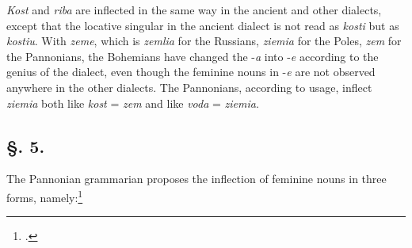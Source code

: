 \textit{Kost} and \textit{riba} are inflected in the same way in the ancient and other dialects, except that the locative singular in the ancient dialect is not read as \textit{kosti} but as \textit{kostiu}. With \textit{zeme}, which is \textit{zemlia} for the Russians, \textit{ziemia} for the Poles, \textit{zem} for the Pannonians, the Bohemians have changed the -\textit{a} into -\textit{e} according to the genius of the dialect, even though the feminine nouns in -\textit{e} are not observed anywhere in the other dialects. The Pannonians, according to usage, inflect \textit{ziemia} both like \textit{kost} = \textit{zem} and like \textit{voda} = \textit{ziemia}.

\subsection*{\hspace*{\fill}§. 5.\hspace*{\fill}}

The Pannonian grammarian proposes the inflection of feminine nouns in three forms, namely:\footnote{\citet[37]{bernolak_grammatica_1790}.}


